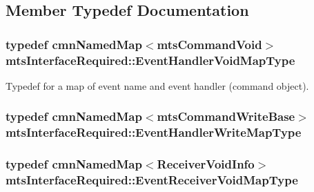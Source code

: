 \subsection{Member Typedef Documentation}
\hypertarget{classmts_interface_required_a1f6cca73d8dffb794e3778092b375783}{
\subsubsection[{Event\-Handler\-Void\-Map\-Type}]{\setlength{\rightskip}{0pt plus 5cm}typedef {\bf cmn\-Named\-Map}$<${\bf mts\-Command\-Void}$>$ {\bf mts\-Interface\-Required\-::\-Event\-Handler\-Void\-Map\-Type}\hspace{0.3cm}{\ttfamily [protected]}}}\label{classmts_interface_required_a1f6cca73d8dffb794e3778092b375783}
Typedef for a map of event name and event handler (command object). \hypertarget{classmts_interface_required_a8ea82ecaf05dc0aca4595ac685b8a43f}{
\subsubsection[{Event\-Handler\-Write\-Map\-Type}]{\setlength{\rightskip}{0pt plus 5cm}typedef {\bf cmn\-Named\-Map}$<${\bf mts\-Command\-Write\-Base}$>$ {\bf mts\-Interface\-Required\-::\-Event\-Handler\-Write\-Map\-Type}\hspace{0.3cm}{\ttfamily [protected]}}}\label{classmts_interface_required_a8ea82ecaf05dc0aca4595ac685b8a43f}
\hypertarget{classmts_interface_required_a4f0c15e3c51f635a969eb8706a55afb1}{
\subsubsection[{Event\-Receiver\-Void\-Map\-Type}]{\setlength{\rightskip}{0pt plus 5cm}typedef {\bf cmn\-Named\-Map}$<${\bf Receiver\-Void\-Info}$>$ {\bf mts\-Interface\-Required\-::\-Event\-Receiver\-Void\-Map\-Type}\hspace{0.3cm}{\ttfamily [protected]}}}\label{classmts_interface_required_a4f0c15e3c51f635a969eb8706a55afb1}
